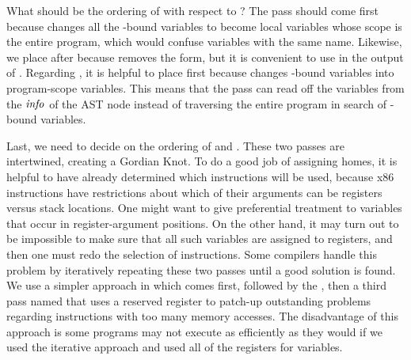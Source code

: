 \documentclass[11pt]{book}
\begin{document}
What should be the ordering of  with respect to
? The  pass should come first because
 changes all the -bound variables to
become local variables whose scope is the entire program, which would
confuse variables with the same name.
%
Likewise, we place  after
 because  removes
the  form, but it is convenient to use  in the
output of .
%
Regarding , it is helpful to place
 first because  changes
-bound variables into program-scope variables.  This means
that the  pass can read off the variables from the
$\mathit{info}$ of the  AST node instead of traversing the
entire program in search of -bound variables.

Last, we need to decide on the ordering of 
and .  These two passes are intertwined, creating a
Gordian Knot. To do a good job of assigning homes, it is helpful to
have already determined which instructions will be used, because x86
instructions have restrictions about which of their arguments can be
registers versus stack locations. One might want to give preferential
treatment to variables that occur in register-argument positions. On
the other hand, it may turn out to be impossible to make sure that all
such variables are assigned to registers, and then one must redo the
selection of instructions. Some compilers handle this problem by
iteratively repeating these two passes until a good solution is found.
We use a simpler approach in which 
comes first, followed by the , then a third
pass named  that uses a reserved register to
patch-up outstanding problems regarding instructions with too many
memory accesses. The disadvantage of this approach is some programs
may not execute as efficiently as they would if we used the iterative
approach and used all of the registers for variables.
\end{document}
